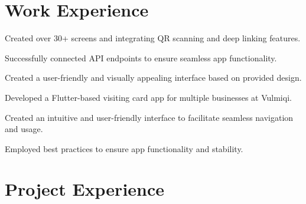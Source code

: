 \documentclass[]{resume}
\begin{document}
\begin{minipage}[t]{0.66\textwidth} 


\section{Work Experience}

\begin{tightemize}
\vspace{\topsep}
\item Created over 30+ screens and integrating QR scanning and deep linking features.
\item Successfully connected API endpoints to ensure seamless app functionality.
\item Created a user-friendly and visually appealing interface based on provided design.
\end{tightemize}
\sectionsep

\begin{tightemize}
\item Developed a Flutter-based visiting card app for multiple businesses at Vulmiqi.
\item Created an intuitive and user-friendly interface to facilitate seamless navigation and usage.
\item Employed best practices to ensure app functionality and stability.
\end{tightemize}
\sectionsep


\section{Project Experience}



\end{minipage}
\end{document}
